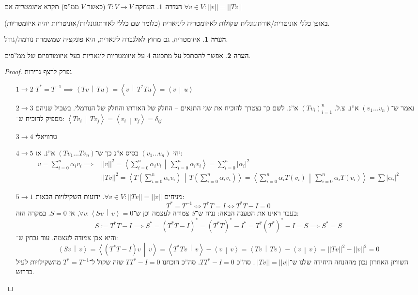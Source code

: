 \documentclass[a4paper]{article}
\newcommand\ra    {\rangle}
\newcommand\la    {\langle}
\newcommand\sumni     {\sum_{i = 0}^{n}}
\newcommand\co        {\colon}
\newcommand\norm[1]   {\left \vert \left \vert #1 \right \vert \right \vert}
\newcommand\mut [2]   {\left \la #1 \,\middle\vert\, #2 \right \ra}
\newcommand\ag        {\alpha}
\newcommand\dg        {\delta}
\newcommand\op    {^{-1}}
\newcommand\cl [1]    {\left ( #1 \right )}
\theoremstyle{definition}
\newtheorem{Definition}{\color{mygreen}הגדרה}
\newtheorem{Remark}{\color{mycyan}הערה}
\newcommand\defi  [1] {\begin{Definition}#1\end{Definition}}
\newcommand\rmark [1] {\begin{Remark}#1\end{Remark}}
\begin{document}
	
	\defi{העתקה $T \co V \to V$ (כאשר $V$ ממ''פ) תקרא \textit{איזומטריה} אם $\forall v \in V \co \norm{v} = \norm{Tv}$}
	
	באופן כללי אוניטרית/אורתוגונלית שקולות לאיזומטריה ליניארית (כלומר שם כללי לאורתוגונליות/אוניטריות יהיה איזומטריות). 
	
	\rmark{איזומטריה, גם מחוץ לאלגברה לינארית, היא פונקציה שמשמרת נורמה/גודל. }
	
	\rmark{אפשר להסתכל על מתכונה 4 על איזומטריות לינאריות כעל איזומורפיזם של ממ''פים. }
	
	\begin{proof}נפרק לרצף גרירות
		\begin{enumerate}
			\item[$1 \to 2$] \hfil $T^* = T\op \implies \mut{Tv}{Tu} = \mut{v}{T^*Tu} = \mut{v}{u}$
			\item[$2 \to 3$] נאמר ש־$(v_1 \dots v_n)$ א''נ. צ.ל. $(Tv_i)_{i = 1}^{n}$ א''נ. לשם כך נצטרך להוכיח את שני התנאים – החלק של האורתו והחלק של הנורמלי. בשביל שניהם מספיק להוכיח ש־: 
			$\mut{Tv_i}{Tv_j} = \mut{v_i}{v_j}  = \dg_{ij}$
			\item[$3 \to 4$]טרוויאלי
			\item[$4 \to 5$]יהי $(v_1 \dots v_n)$ בסיס א''נ כך ש־$(Tv_1 \dots Tv_n)$ א''נ. אז: 
			\begin{align*}
				v = \sumni \ag_i v_i \implies &\norm{v}^2 = \mut{\sumni \ag_i v_i}{\sumni \ag_i v_i} = \sumni |\ag_i|^2 \\
				&\norm{Tv}^2 = \mut{T\cl{\sumni \ag_i v_i}}{T\cl{\sumni \ag_i v_i}} = \mut{\sumni \ag_i T(v_i)}{\sumni \ag_i T(v_i)} = \sum |\ag_i|^2
			\end{align*}
			\item[$5 \to 1$]מניחים $\forall v \in V \co \norm{Tv} = \norm{v}$. ידועות השקילויות הבאות: 
			\[ T^* = T\op \iff T^*T = I \iff T^*T - I = 0 \]
			בעבר ראינו את הטענה הבאה: נניח ש־$S$ צמודה לעצמה וכן ש־$\forall v \co \mut{Sv}{v} = 0$, אז $S = 0$. במקרה הזה: 
			\[ S := T^*T - I \implies S^* = (T^*T - I)^* = (T^*T)^* - I^* = T^*(T^*)^* - I =S \implies S^* = S \]
			והיא אכן צמודה לעצמה. עוד נבחין ש־: 
			\[ \mut{Sv}{v} = \mut{(T^* T - I)v}{v} =\mut{T^*Tv}{v} - \mut{v}{v} = \mut{Tv}{Tv} - \mut{v}{v} = \norm{Tv}^2 - \norm{v}^2 = 0 \]
			השוויון האחרון נכון מההנחה היחידה שלנו ש־$\norm{Tv} = \norm{v}$. סה''כ $TT^* - I = 0$. סה''כ הוכחנו $TT^* - I = 0$ שזה שקול ל־$T^* = T\op$ מהשקילויות לעיל כדרוש. 
		\end{enumerate}
	\end{proof}
	
\end{document}
